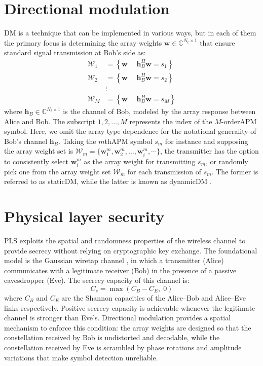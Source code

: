 \section{Directional modulation}
\label{sec:directional_modulation}

\gls{DM} is a technique that can be implemented in various ways, but in each of them the primary focus is determining the array weights $\mathbf{w} \in \mathbb{C}^{N_t \times 1}$ that ensure standard signal transmission at Bob's side as:
\begin{align}
    \mathcal{W}_1 &= \left\{ \mathbf{w} \ \middle|\ \mathbf{h}^H_B \mathbf{w} = s_1 \right\} \\
    \mathcal{W}_2 &= \left\{ \mathbf{w} \ \middle|\ \mathbf{h}^H_B \mathbf{w} = s_2 \right\} \\
    &\vdots \nonumber \\
    \mathcal{W}_M &= \left\{ \mathbf{w} \ \middle|\ \mathbf{h}^H_B \mathbf{w} = s_M \right\}
    \label{eq:DM_weight_sets}
\end{align}
where $\mathbf{h}_B \in \mathbb{C}^{N_t \times 1}$ is the channel of Bob, modeled by the array response between Alice and Bob. The subscript $1, 2, \dots, M$ represents the index of the $M$-order\gls{APM} symbol. Here, we omit the array type dependence for the notational generality of Bob's channel $\mathbf{h}_B$.
Taking the $m$th\gls{APM} symbol $s_m$ for instance and supposing the array weight set is $\mathcal{W}_m = \{\mathbf{w}^m_1, \mathbf{w}^m_2, \dots, \mathbf{w}^m_i, \cdots \}$, the transmitter has the option to consistently select $\mathbf{w}^m_i$ as the array weight for transmitting $s_m$, or randomly pick one from the array weight set $\mathcal{W}_m$ for each transmission of $s_m$. The former is referred to as static\gls{DM}, while the latter is known as dynamic\gls{DM} \cite{chen2025survey}.

\section{Physical layer security}
\label{sec:physical_layer_security}

\gls{PLS} exploits the spatial and randomness properties of the wireless channel to provide secrecy without relying on cryptographic key exchange. The foundational model is the Gaussian wiretap channel \cite{wyner1975wiretap}, in which a transmitter (Alice) communicates with a legitimate receiver (Bob) in the presence of a passive eavesdropper (Eve). The secrecy capacity of this channel is:
\begin{equation}
    C_s = \max(C_B - C_E,\; 0)
\end{equation}
where $C_B$ and $C_E$ are the Shannon capacities of the Alice--Bob and Alice--Eve links respectively. Positive secrecy capacity is achievable whenever the legitimate channel is stronger than Eve's.
Directional modulation provides a spatial mechanism to enforce this condition: the array weights are designed so that the constellation received by Bob is undistorted and decodable, while the constellation received by Eve is scrambled by phase rotations and amplitude variations that make symbol detection unreliable.


